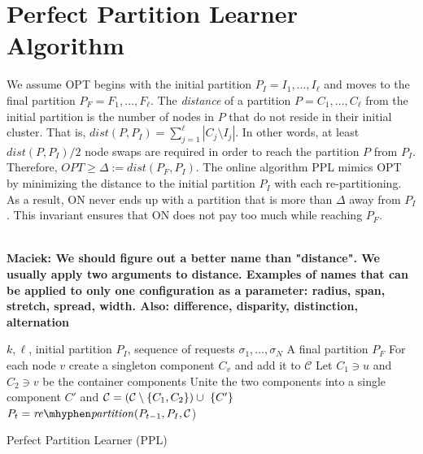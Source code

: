 \documentclass[manuscript,screen=true]{acmart}
\newcommand{\OPT}{\mathit{OPT}}
\DeclarePairedDelimiter\set{\{}{\}}
\newcommand\maciek[1]{\color{brown}\textbf{\\ Maciek: #1}\color{black}}
\begin{document}
\section{Perfect Partition Learner Algorithm}	\label{sec:upperbound}
     
We assume OPT begins with the initial partition
$P_I = I_1, \dots, I_{\ell}$ and moves to the final partition
$P_F = F_1, \dots, F_{\ell}$.
 The \emph{distance} of a partition $P = C_1, \dots, C_{\ell}$ from the initial partition is the number of nodes in $P$ that do not reside in their initial cluster.
    That is,
    $\mathit{dist}(P, P_I) = \sum_{j=1}^{\ell} | C_j \setminus I_j |$. 
In other words,
at least $\mathit{dist}(P, P_I)/2$ node swaps are required in order to reach the partition $P$ from $P_I$.
Therefore,
$\OPT \geq \Delta:= dist(P_F, P_I) $.
The online algorithm PPL mimics OPT by minimizing the distance to the initial partition $P_I$ with each re-partitioning.
As a result,
ON never ends up with a partition that is more than $\Delta$ away from $P_I$.
This invariant ensures that ON does not pay too much while reaching $P_F$.

\maciek{We should figure out a better name than "distance". We usually apply two arguments to distance. Examples of names that can be applied to only one configuration as a parameter: radius, span, stretch, spread, width. Also: difference, disparity, distinction, alternation}

\begin{algorithm}
    \renewcommand{\algorithmicrequire}{\textbf{Input:}}
    \renewcommand{\algorithmicensure}{\textbf{Output:}}
    \begin{algorithmic}[1]
        \Require 
        $k, \ell$,
        initial partition $P_I$,
        sequence of  requests $\sigma_1, \dots, \sigma_N$ 
        \Ensure A final partition $P_F$ 
        \State For each node $v$ create a singleton component $C_v$ and add it to $\mathcal{C}$
         \label{line:initcomponents}
        \State Let $C_1 \ni u$ and $C_2 \ni v$ be the container components
        \State Unite the two components into a single component $C'$ and
        $\mathcal{C} = (\mathcal{C}\setminus\set{C_1, C_2}) \cup ~\set{C'}$ \label{line:mergecomponents}
        \State $P_{t} = \mathit{re\mhyphen partition}(P_{t-1}, P_I, \mathcal{C}$) \label{line:rebalance} 
        \EndIf
        \EndIf
        \EndFor
    \end{algorithmic}
    \caption{Perfect Partition Learner (PPL)}
    \label{alg:ppl}
      \end{algorithm}
  
\end{document}
